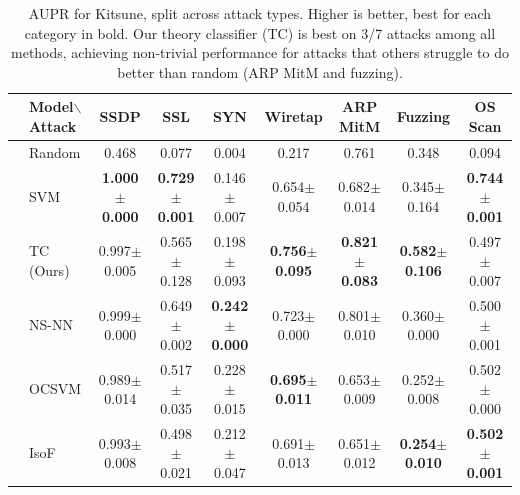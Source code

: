\documentclass{article}
\begin{document}
\begin{table}[]
    \centering
    \caption{AUPR for Kitsune, split across attack types. 
    Higher is better, best for each category in bold.
    Our theory classifier (TC) is best on 3/7 attacks among all methods, achieving non-trivial performance for attacks that others struggle to do better than random (ARP MitM and fuzzing).
    }
  \begin{adjustbox}{width=\textwidth}
    \begin{tabular}{cl|ccccccc}
    \toprule
        &Model$\backslash$Attack & SSDP & SSL & SYN & Wiretap & ARP MitM & Fuzzing & OS Scan \\
         \midrule
        &Random & 0.468 & 0.077 & 0.004 & 0.217 & 0.761 & 0.348 & 0.094 \\
                \midrule
        \parbox[t]{2mm}{} & SVM & \textbf{1.000$\pm$0.000} & \textbf{0.729$\pm$0.001} & 0.146$\pm$0.007 & 0.654$\pm$0.054 & 0.682$\pm$0.014 & 0.345$\pm$0.164 & \textbf{0.744$\pm$0.001} \\
        &TC (Ours) & {{0.997$\pm$0.005}} & {0.565$\pm$0.128} & 0.198$\pm$0.093 & \textbf{0.756$\pm$0.095} & \textbf{{0.821$\pm$0.083}} & \textbf{0.582$\pm$0.106} & 0.497$\pm$0.007 \\
        &NS-NN & 0.999$\pm$0.000 & 0.649$\pm$0.002 & \bf{0.242$\pm$0.000} & 0.723$\pm$0.000 & 0.801$\pm$0.010 & 0.360$\pm$0.000 & 0.500$\pm$0.001 \\
        \midrule
        \parbox[t]{2mm}{} & OCSVM & 0.989$\pm$0.014 & 0.517$\pm$0.035 & 0.228$\pm$0.015 & \bf{0.695$\pm$0.011} & 0.653$\pm$0.009 & 0.252$\pm$0.008 & 0.502$\pm$0.000 \\
        &IsoF & 0.993$\pm$0.008 & 0.498$\pm$0.021 & 0.212$\pm$0.047 & 0.691$\pm$0.013 & 0.651$\pm$0.012 & \bf{0.254$\pm$0.010} & \textbf{0.502$\pm$0.001} \\

\end{tabular}
\end{adjustbox}
\end{table}
\end{document}
